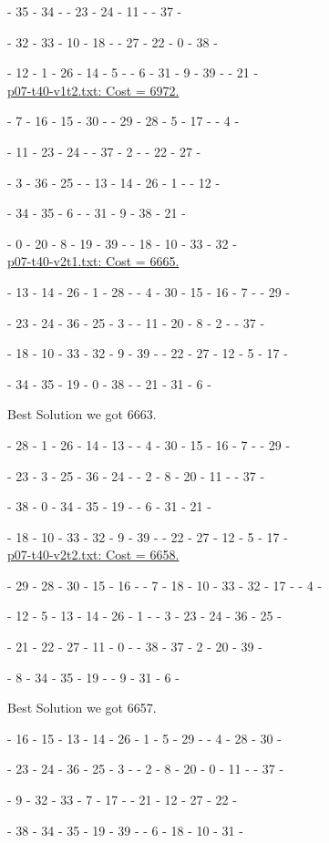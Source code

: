 \tb - 35 - 34 - \tb - 23 - 24 - 11 - \tb - 37 - \tb 

\te - 32 - 33 - 10 - 18 - \te - 27 - 22 - 0 - 38 - \te 

\te - 12 - 1 - 26 - 14 - 5 - \te - 6 - 31 - 9 - 39 - \te - 21 - \te 
\\

\underline{p07-t40-v1t2.txt: Cost =  6972.}

\ta - 7 - 16 - 15 - 30 - \ta - 29 - 28 - 5 - 17 - \ta - 4 - \ta

\tc - 11 - 23 - 24 - \tc - 37 - 2 - \tc - 22 - 27 - \tc

\tc - 3 - 36 - 25 - \tc - 13 - 14 - 26 - 1 - \tc - 12 - \tc 

\te - 34 - 35 - 6 - \te - 31 - 9 - 38 - 21 - \te 

\te - 0 - 20 - 8 - 19 - 39 - \te - 18 - 10 - 33 - 32 - \te 
\\

\underline{p07-t40-v2t1.txt: Cost = 6665.}

\ta - 13 - 14 - 26 - 1 - 28 - \ta - 4 - 30 - 15 - 16 - 7 - \ta - 29 - \ta

\tb - 23 - 24 - 36 - 25 - 3 - \tb - 11 - 20 - 8 - 2 - \tb - 37 - \tb

\te - 18 - 10 - 33 - 32 - 9 - 39 - \te - 22 - 27 - 12 - 5 - 17 - \te 

\te - 34 - 35 - 19 - 0 - 38 - \te - 21 - 31 - 6 - \te 

Best  Solution we got  6663.

\ta - 28 - 1 - 26 - 14 - 13 - \ta - 4 - 30 - 15 - 16 - 7 - \ta - 29 - \ta

\tb - 23 - 3 - 25 - 36 - 24 - \tb - 2 - 8 - 20 - 11 - \tb - 37 - \tb 

\te - 38 - 0 - 34 - 35 - 19 - \te - 6 - 31 - 21 - \te 

\te - 18 - 10 - 33 - 32 - 9 - 39 - \te - 22 - 27 - 12 - 5 - 17 - \te 
\\

\underline{p07-t40-v2t2.txt: Cost = 6658.}

\ta - 29 - 28 - 30 - 15 - 16 - \ta - 7 - 18 - 10 - 33 - 32 - 17 - \ta - 4 - \ta

\tc - 12 - 5 - 13 - 14 - 26 - 1 - \tc - 3 - 23 - 24 - 36 - 25 - \tc

\te - 21 - 22 - 27 - 11 - 0 - \te - 38 - 37 - 2 - 20 - 39 - \te 

\te - 8 - 34 - 35 - 19 - \te - 9 - 31 - 6 - \te 

Best  Solution we got  6657.

\ta - 16 - 15 - 13 - 14 - 26 - 1 - 5 - 29 - \ta - 4 - 28 - 30 - \ta

\tb - 23 - 24 - 36 - 25 - 3 - \tb - 2 - 8 - 20 - 0 - 11 - \tb - 37 - \tb 

\te- 9 - 32 - 33 - 7 - 17 - \te - 21 - 12 - 27 - 22 - \te 

\te- 38 - 34 - 35 - 19 - 39 - \te - 6 - 18 - 10 - 31 - \te 


